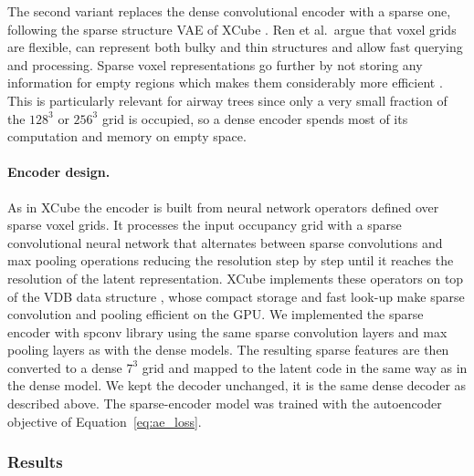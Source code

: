 The second variant replaces the dense convolutional encoder with a sparse one, following
the sparse structure VAE of XCube \cite{ren2024}. Ren et al.\ argue that voxel grids are
flexible, can represent both bulky and thin structures and allow fast querying and
processing. Sparse voxel representations go further by not storing any information for empty
regions which makes them considerably more efficient \cite{ren2024}. This is particularly
relevant for airway trees since only a very small fraction of the $128^3$ or $256^3$ grid is
occupied, so a dense encoder spends most of its computation and memory on empty space.

\paragraph{Encoder design.}              %
As in XCube \cite{ren2024} the encoder is built from neural network operators defined over
sparse voxel grids. It processes the input occupancy grid with a sparse convolutional neural
network that alternates between sparse convolutions and max pooling operations reducing the
resolution step by step until it reaches the resolution of the latent representation. XCube
implements these operators on top of the VDB data structure \cite{museth2013}, whose compact
storage and fast look-up make sparse convolution and pooling efficient on the GPU. We
implemented the sparse encoder with spconv library using the same sparse convolution layers and max pooling layers as with the dense models. The resulting sparse features are then converted to a dense $7^3$
grid and mapped to the latent code in the same way as in the dense model.       %
We kept the decoder unchanged, it is the same dense decoder as described above.
The sparse-encoder model was trained with the autoencoder objective of Equation~\eqref{eq:ae_loss}.

\subsubsection{Results}                  %
\label{sec:ae_results}                   %

